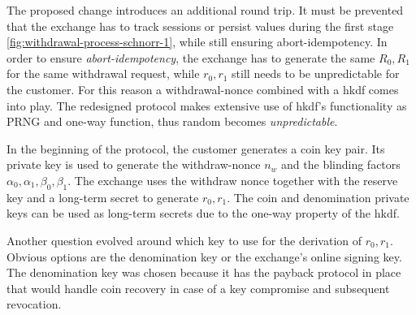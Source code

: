 The proposed change introduces an additional round trip.
It must be prevented that the exchange has to track sessions or persist values during the first stage \ref{fig:withdrawal-process-schnorr-1}, while still ensuring \gls{abort-idempotency}.
In order to ensure \textit{\gls{abort-idempotency}}, the exchange has to generate the same $R_0,R_1$ for the same withdrawal request, while $r_0,r_1$ still needs to be unpredictable for the customer.
For this reason a withdrawal-nonce combined with a \gls{hkdf} comes into play.
The redesigned protocol makes extensive use of \gls{hkdf}'s functionality as \ac{PRNG} and one-way function, thus random becomes \textit{unpredictable}.

In the beginning of the protocol, the customer generates a coin key pair.
Its private key is used to generate the withdraw-nonce $n_w$ and the blinding factors $\alpha_0, \alpha_1, \beta_0, \beta_1$.
The exchange uses the withdraw nonce together with the reserve key and a long-term secret to generate $r_0, r_1$.
The coin and denomination private keys can be used as long-term secrets due to the one-way property of the \gls{hkdf}.

Another question evolved around which key to use for the derivation of $ r_0, r_1 $.
Obvious options are the denomination key or the exchange's online signing key.
The denomination key was chosen because it has the payback protocol in place that would handle coin recovery in case of a key compromise and subsequent revocation.

